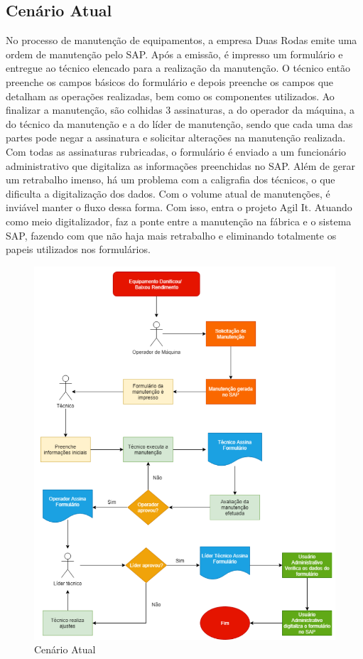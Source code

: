 \subsection{Cenário Atual}
No processo de manutenção de equipamentos, a empresa Duas Rodas emite uma ordem de manutenção pelo SAP. Após a emissão, é impresso um formulário e entregue ao técnico elencado para a realização da manutenção. O técnico então preenche os campos básicos do formulário e depois preenche os campos que detalham as operações realizadas, bem como os componentes utilizados. Ao finalizar a manutenção, são colhidas 3 assinaturas, a do operador da máquina, a do técnico da manutenção e a do líder de manutenção, sendo que cada uma das partes pode negar a assinatura e solicitar alterações na manutenção realizada. Com todas as assinaturas rubricadas, o formulário é enviado a um funcionário administrativo que digitaliza as informações preenchidas no SAP. Além de gerar um retrabalho imenso, há um problema com a caligrafia dos técnicos, o que dificulta a digitalização dos dados. Com o volume atual de manutenções, é inviável manter o fluxo dessa forma. Com isso, entra o projeto Agil It. Atuando como meio digitalizador, faz a ponte entre a manutenção na fábrica e o sistema SAP, fazendo com que não haja mais retrabalho e eliminando totalmente os papeis utilizados nos formulários.


\begin{figure}[H]
	\caption{\label{cenario_atual1}Cenário Atual}
	\begin{center}
		\includegraphics[scale=0.75]{./Figuras/cenario-atual1.png}
	\end{center}
\end{figure}


